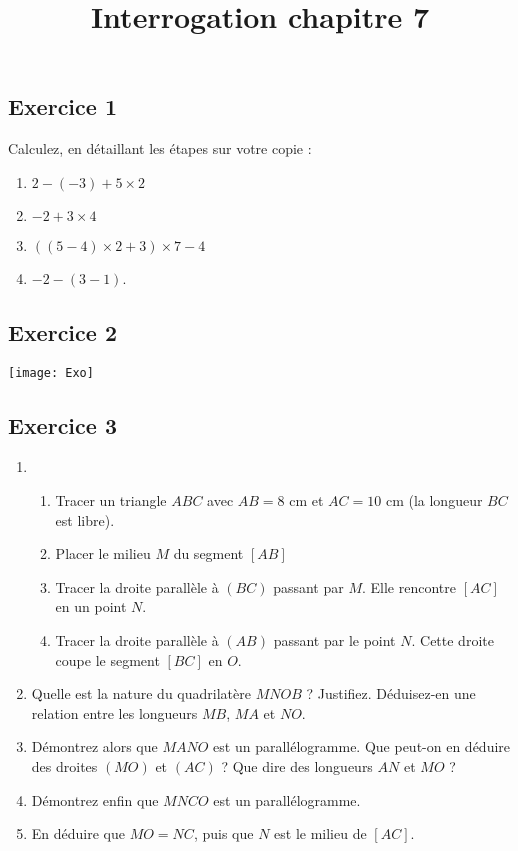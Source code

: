 \documentclass[14pt]{extreport}
\title{Interrogation chapitre 7}
\date{}
\theoremstyle{plain}
\begin{document}
 \subsection*{Exercice 1}
Calculez, en détaillant les étapes sur votre copie : 

\begin{enumerate}
\item $2 - (-3) + 5 \times  2$
\item $ -2 + 3 \times 4$
\item $((5 - 4) \times 2 + 3 )\times 7 - 4$
\item $-2 - (3 - 1)$.
\end{enumerate}

\subsection*{Exercice 2}
\texttt{[image: Exo]}

\subsection*{Exercice 3} %

\begin{enumerate}
\item  \begin{enumerate}
	\item Tracer un triangle $ABC$ avec $AB = 8$ cm et $AC = 10$ cm (la longueur $BC$ est libre). 
	\item Placer le milieu $M$ du segment $[AB]$
	\item Tracer la droite parallèle à $(BC)$ passant par $M$. Elle rencontre $[AC]$ en un point $N$. 
	\item Tracer la droite parallèle à $(AB)$ passant par le point $N$. Cette droite coupe le segment $[BC]$ en $O$. 
\end{enumerate}
\item  Quelle est la nature du quadrilatère $MNOB$ ? Justifiez. Déduisez-en une relation entre les longueurs $MB$, $MA$ et $NO$. 
\item Démontrez alors que $MANO$ est un parallélogramme. Que peut-on en déduire des droites $(MO)$ et $(AC)$ ? Que dire des longueurs $AN$ et $MO$ ? 
\item Démontrez enfin que $MNCO$ est un parallélogramme.
\item En déduire que $MO=NC$, puis que $N$ est le milieu de $[AC]$.

\end{enumerate}
\end{document}
